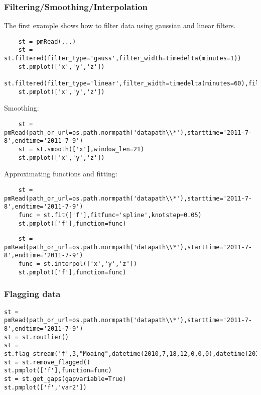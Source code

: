 \subsubsection{Filtering/Smoothing/Interpolation}

The first example shows how to filter data using gaussian and linear filters.
\begin{verbatim}
    st = pmRead(...)
    st = st.filtered(filter_type='gauss',filter_width=timedelta(minutes=1))
    st.pmplot(['x','y','z'])
    st.filtered(filter_type='linear',filter_width=timedelta(minutes=60),filter_offset=timedelta(minutes=30))
    st.pmplot(['x','y','z'])
\end{verbatim}

Smoothing:
\begin{verbatim}
    st = pmRead(path_or_url=os.path.normpath('datapath\\*'),starttime='2011-7-8',endtime='2011-7-9')
    st = st.smooth(['x'],window_len=21)
    st.pmplot(['x','y','z'])
\end{verbatim}

Approximating functions and fitting:
\begin{verbatim}
    st = pmRead(path_or_url=os.path.normpath('datapath\\*'),starttime='2011-7-8',endtime='2011-7-9')
    func = st.fit(['f'],fitfunc='spline',knotstep=0.05)
    st.pmplot(['f'],function=func)
\end{verbatim}

\begin{verbatim}
    st = pmRead(path_or_url=os.path.normpath('datapath\\*'),starttime='2011-7-8',endtime='2011-7-9')
    func = st.interpol(['x','y','z'])
    st.pmplot(['f'],function=func)
\end{verbatim}

\subsubsection{Flagging data}

\begin{verbatim}
st = pmRead(path_or_url=os.path.normpath('datapath\\*'),starttime='2011-7-8',endtime='2011-7-9')
st = st.routlier()
st = st.flag_stream('f',3,"Moaing",datetime(2010,7,18,12,0,0,0),datetime(2010,7,18,13,0,0,0))
st = st.remove_flagged()
st.pmplot(['f'],function=func)
st = st.get_gaps(gapvariable=True)
st.pmplot(['f','var2'])
\end{verbatim}


